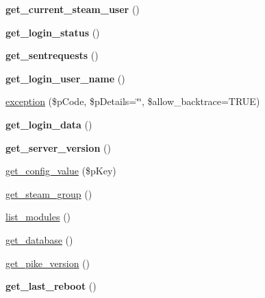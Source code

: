 \begin{DoxyCompactItemize}
\item 
\hypertarget{classsteam__connection_ad420df8005cfac69368beb4677a10c06}{
{\bfseries get\_\-current\_\-steam\_\-user} ()}
\label{classsteam__connection_ad420df8005cfac69368beb4677a10c06}

\item 
\hypertarget{classsteam__connection_ad86c4ff015efd28ebf742b712e9de3a9}{
{\bfseries get\_\-login\_\-status} ()}
\label{classsteam__connection_ad86c4ff015efd28ebf742b712e9de3a9}

\item 
\hypertarget{classsteam__connection_aa5376bb97df0342140ec9f24c71d21da}{
{\bfseries get\_\-sentrequests} ()}
\label{classsteam__connection_aa5376bb97df0342140ec9f24c71d21da}

\item 
\hypertarget{classsteam__connection_ad1d074984e5a51ab747c515362ab1f6d}{
{\bfseries get\_\-login\_\-user\_\-name} ()}
\label{classsteam__connection_ad1d074984e5a51ab747c515362ab1f6d}

\item 
\hyperlink{classsteam__connection_a3706c609263aa83dbc071b0429269436}{exception} (\$pCode, \$pDetails=\char`\"{}\char`\"{}, \$allow\_\-backtrace=TRUE)
\item 
\hypertarget{classsteam__connection_ad081dbcbf44e122f032c237fb6e32512}{
{\bfseries get\_\-login\_\-data} ()}
\label{classsteam__connection_ad081dbcbf44e122f032c237fb6e32512}

\item 
\hypertarget{classsteam__connection_ab1d1f6ad3b7b9e8eb1d52aa2d0297292}{
{\bfseries get\_\-server\_\-version} ()}
\label{classsteam__connection_ab1d1f6ad3b7b9e8eb1d52aa2d0297292}

\item 
\hyperlink{classsteam__connection_ab2d21bad17c41ed4612db7d9254f0021}{get\_\-config\_\-value} (\$pKey)
\item 
\hyperlink{classsteam__connection_ac1cc1f638100227e3c83e45010c0808a}{get\_\-steam\_\-group} ()
\item 
\hyperlink{classsteam__connection_ac9efb0d6b5cfec747ac507add87cb6b5}{list\_\-modules} ()
\item 
\hyperlink{classsteam__connection_a888ccf2466c74dbb69f44006853c7983}{get\_\-database} ()
\item 
\hyperlink{classsteam__connection_a67e488e7c3e677f132a01c7ed0830e4e}{get\_\-pike\_\-version} ()
\item 
\hypertarget{classsteam__connection_a48e7d5e184344284fb37d42e71341f05}{
{\bfseries get\_\-last\_\-reboot} ()}
\label{classsteam__connection_a48e7d5e184344284fb37d42e71341f05}

\end{DoxyCompactItemize}
